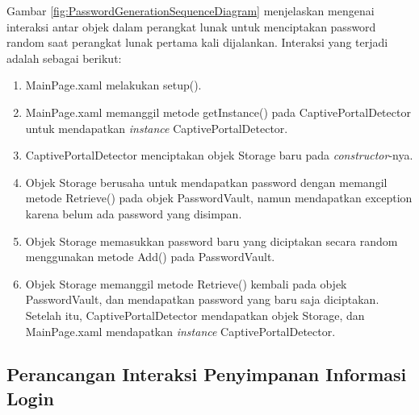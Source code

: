 Gambar \ref{fig:PasswordGenerationSequenceDiagram} menjelaskan mengenai interaksi antar objek dalam perangkat lunak untuk menciptakan password random saat perangkat lunak pertama kali dijalankan. Interaksi yang terjadi adalah sebagai berikut:

\begin{enumerate}
    \item{MainPage.xaml melakukan setup().}
    \item{MainPage.xaml memanggil metode getInstance() pada CaptivePortalDetector untuk mendapatkan \textit{instance} CaptivePortalDetector.}
    \item{CaptivePortalDetector menciptakan objek Storage baru pada \textit{constructor}-nya.}
    \item{Objek Storage berusaha untuk mendapatkan password dengan memangil metode Retrieve() pada objek PasswordVault, namun mendapatkan exception karena belum ada password yang disimpan.}
    \item{Objek Storage memasukkan password baru yang diciptakan secara random menggunakan metode Add() pada PasswordVault.}
    \item{Objek Storage memanggil metode Retrieve() kembali pada objek PasswordVault, dan mendapatkan password yang baru saja diciptakan. Setelah itu, CaptivePortalDetector mendapatkan objek Storage, dan MainPage.xaml mendapatkan \textit{instance} CaptivePortalDetector.}
\end{enumerate}

\subsection{Perancangan Interaksi Penyimpanan Informasi Login}
\label{subsec:perancangan_interaksi_penciptaan_password}

